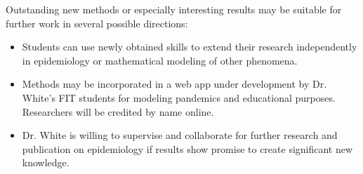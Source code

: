 \documentclass{article}
\begin{document}
\begin{itemize}
Outstanding new methods or especially interesting results may be suitable for further work in several possible directions:

\begin{itemize}
\item Students can use newly obtained skills to extend their research independently in epidemiology or mathematical modeling of other phenomena.

\item Methods may be incorporated in a web app under development by Dr. White's FIT students for modeling pandemics and educational purposes. Researchers will be credited by name online.

\item Dr. White is willing to supervise and collaborate for further research and publication on epidemiology if results show promise to create significant new knowledge.
\end{itemize}

\end{itemize}
\end{document}
